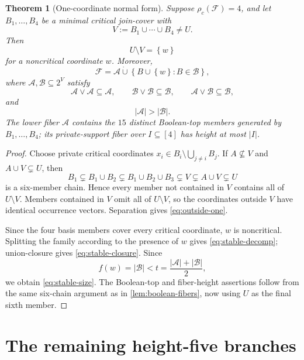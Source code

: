 \documentclass[11pt,reqno]{amsart}
\numberwithin{equation}{section}
\newtheorem{theorem}{Theorem}[section]
\theoremstyle{definition}
\theoremstyle{remark}
\newcommand{\F}{\mathcal{F}}
\newcommand{\A}{\mathcal{A}}
\newcommand{\1}{\mathbf{1}}
\newcommand{\set}[1]{\left\{#1\right\}}
\newcommand{\abs}[1]{\left|#1\right|}
\newcommand{\join}{\mathbin{\vee}}
\begin{document}
\begin{theorem}[One-coordinate normal form]\label{thm:four-cover-normal}
Suppose \(\rho_c(\F)=4\), and let \(B_1,\dots,B_4\) be a minimal critical join-cover with
\[
V:=B_1\cup\cdots\cup B_4\ne U.
\]
Then
\begin{equation}\label{eq:outside-one}
U\setminus V=\set{w}
\end{equation}
for a noncritical coordinate \(w\).  Moreover,
\begin{equation}\label{eq:stable-decomp}
\F
=\A\mathbin{\dot\cup}
\set{B\cup\set{w}:B\in\mathcal B},
\end{equation}
where \(\A,\mathcal B\subseteq2^V\) satisfy
\begin{equation}\label{eq:stable-closure}
\A\join\A\subseteq\A,
\qquad
\mathcal B\join\mathcal B\subseteq\mathcal B,
\qquad
\A\join\mathcal B\subseteq\mathcal B,
\end{equation}
and
\begin{equation}\label{eq:stable-size}
\abs\A>\abs{\mathcal B}.
\end{equation}
The lower fiber \(\A\) contains the \(15\) distinct Boolean-top members generated by \(B_1,\dots,B_4\); its private-support fiber over \(I\subseteq[4]\) has height at most \(\abs I\).
\end{theorem}

\begin{proof}
Choose private critical coordinates
\(
x_i\in B_i\setminus\bigcup_{j\ne i}B_j
\).
If \(A\nsubseteq V\) and \(A\cup V\subsetneq U\), then
\[
B_1
\subsetneq B_1\cup B_2
\subsetneq B_1\cup B_2\cup B_3
\subsetneq V
\subsetneq A\cup V
\subsetneq U
\]
is a six-member chain.  Hence every member not contained in \(V\) contains all of \(U\setminus V\).  Members contained in \(V\) omit all of \(U\setminus V\), so the coordinates outside \(V\) have identical occurrence vectors.  Separation gives \cref{eq:outside-one}.

Since the four basis members cover every critical coordinate, \(w\) is noncritical.  Splitting the family according to the presence of \(w\) gives \cref{eq:stable-decomp}; union-closure gives \cref{eq:stable-closure}.  Since
\[
f(w)=\abs{\mathcal B}<t
=\frac{\abs\A+\abs{\mathcal B}}2,
\]
we obtain \cref{eq:stable-size}.  The Boolean-top and fiber-height assertions follow from the same six-chain argument as in \cref{lem:boolean-fibers}, now using \(U\) as the final sixth member.
\end{proof}

\section{The remaining height-five branches}\label{sec:remaining}
\end{document}
